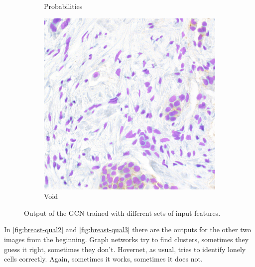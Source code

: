\begin{figure}[H]
\begin{subfigure}[b]{0.45\textwidth}
    \caption{Probabilities}
    \label{fig:breast-no-morph1}
  \end{subfigure}
  \hfill
  \begin{subfigure}[b]{0.45\textwidth}
    \includegraphics[width=\textwidth]{imgs/qual/breast/void1.png}
    \caption{Void}
    \label{fig:consep-void}
  \end{subfigure}
  \caption{Output of the GCN trained with different sets of input features.}
  \label{fig:breast-qual1}
\end{figure}

In \autoref{fig:breast-qual2} and \autoref{fig:breast-qual3} there are the outputs for the other two images from the beginning. Graph networks try to find clusters, sometimes they guess it right, sometimes they don't. Hovernet, as usual, tries to identify lonely cells correctly. Again, sometimes it works, sometimes it does not.


